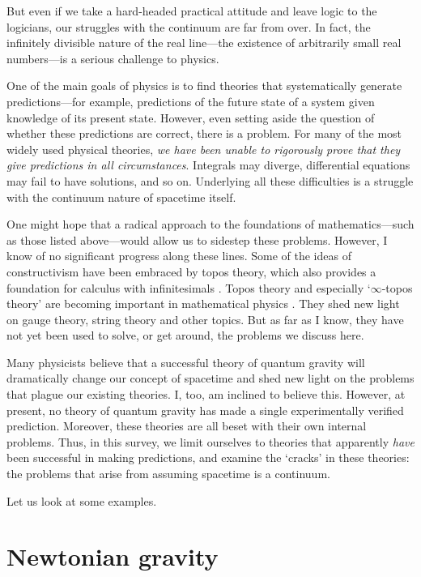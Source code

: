\documentclass[12pt]{article}
\begin{document}
But even if we take a hard-headed practical attitude and leave logic to the logicians, our struggles with the continuum are far from over.  In fact, the infinitely divisible nature of the real line---the 
existence of arbitrarily small real numbers---is a serious challenge to physics. 

One of the main goals of physics is to find theories that systematically generate
predictions---for example, predictions of the future state of a system given 
knowledge of its present state.   However, even setting aside the question of whether
these predictions are correct, there is a problem.  For many of the most widely used physical theories,  \emph{we have been unable to rigorously prove that they give
predictions in all circumstances}.  Integrals may diverge, differential equations may
fail to have solutions, and so on.   Underlying all these difficulties is a struggle with the continuum nature of spacetime itself.   

One might hope that a radical approach to the foundations of mathematics---such as those listed above---would allow us to sidestep these problems.  However, I know of no significant progress along these lines.  Some of the ideas of constructivism have been embraced by topos theory, which also provides a foundation for calculus with infinitesimals \cite{Kock1,Kock2}.  Topos theory and especially `$\infty$-topos theory' are becoming important in mathematical physics \cite{Schreiber}.  They shed new light on gauge theory, string theory and other topics.  But as far as I know, they have not yet been used to solve, or get around, the problems we discuss here.

Many physicists believe that a successful theory of quantum gravity will dramatically change our concept of spacetime and shed new light on the problems that plague our existing theories.   I, too, am inclined to believe this.   However, at present, no theory of quantum gravity has made a single experimentally verified prediction.  Moreover, these theories are all beset with their own internal problems.  Thus, in this survey, we limit ourselves to theories that apparently \emph{have} been successful in making predictions, and examine the `cracks' in these theories: the problems that arise from assuming spacetime is a continuum.

Let us look at some examples.  

\section{Newtonian gravity}
\label{newtonian}
\end{document}
